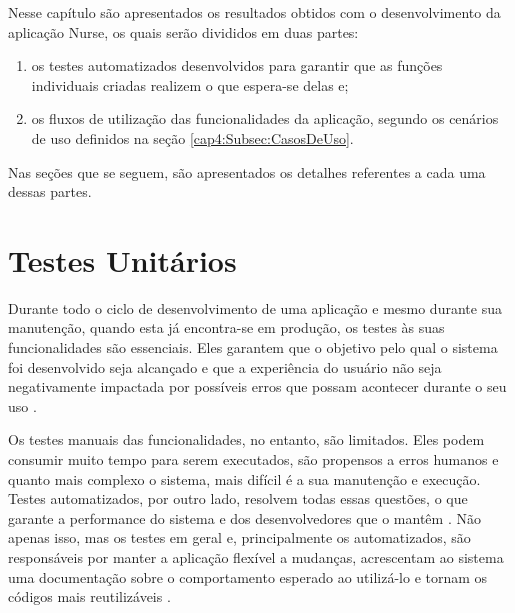 
\label{Cap:ExperimentosResultados}

Nesse capítulo são apresentados os resultados obtidos com o desenvolvimento da aplicação Nurse, os quais serão divididos em duas partes:

\begin{enumerate}[label=\textbf{\roman*}]
  \item os testes automatizados desenvolvidos para garantir que as funções individuais criadas realizem o que espera-se delas e;
  \item os fluxos de utilização das funcionalidades da aplicação, segundo os cenários de uso definidos na seção \ref{cap4:Subsec:CasosDeUso}.
\end{enumerate}

Nas seções que se seguem, são apresentados os detalhes referentes a cada uma dessas partes.

\section{Testes Unitários}
\label{cap5:Sec:TestesUnitarios}
Durante todo o ciclo de desenvolvimento de uma aplicação e mesmo durante sua manutenção, quando esta já encontra-se em produção, os testes às suas funcionalidades são essenciais. Eles garantem que o objetivo pelo qual o sistema foi desenvolvido seja alcançado e que a experiência do usuário não seja negativamente impactada por possíveis erros que possam acontecer durante o seu uso \cite{kong2018automated}.

Os testes manuais das funcionalidades, no entanto, são limitados. Eles podem consumir muito tempo para serem executados, são propensos a erros humanos e quanto mais complexo o sistema, mais difícil é a sua manutenção e execução. Testes automatizados, por outro lado, resolvem todas essas questões, o que garante a performance do sistema e dos desenvolvedores que o mantêm \cite{flutter-testing} \cite{kong2018automated}. Não apenas isso, mas os testes em geral e, principalmente os automatizados, são responsáveis por manter a aplicação flexível a mudanças, acrescentam ao sistema uma documentação sobre o comportamento esperado ao utilizá-lo e tornam os códigos mais reutilizáveis \cite{martin2007professionalism} \cite{martin2011codigo}.

